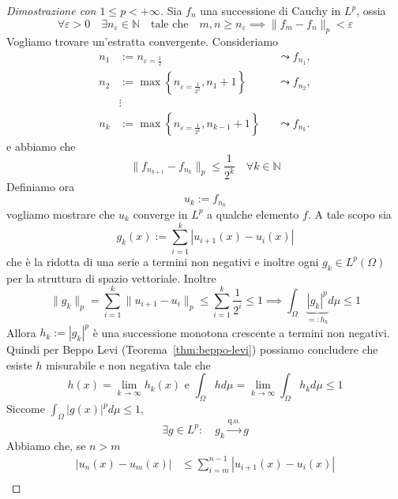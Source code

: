 \begin{proof}[Dimostrazione con \(1 \le p < +\infty\)]
    Sia \(f_{n}\) una successione di Cauchy in \(L^{p}\), ossia
    \begin{equation}\label{eq:cauchy_lp}
        \forall \varepsilon > 0 \quad \exists n_\varepsilon \in \mathbb{N} \quad
        \text{tale che} \quad m, n \ge n_\varepsilon \implies \|f_{m} -
        f_{n}\|_{p} < \varepsilon
    \end{equation}
    Vogliamo trovare un'estratta convergente. Consideriamo
    \[
    \begin{aligned}
        n_1 &:= n_{\varepsilon = \frac{1}{2}} &&\leadsto f_{n_1}, \\
        n_2 &:= \max\left\{n_{\varepsilon = \frac{1}{2^2}}, n_1 + 1\right\} &&\leadsto f_{n_2}, \\
        &\vdots \\
        n_k &:= \max\left\{n_{\varepsilon = \frac{1}{2^k}}, n_{k-1} + 1\right\} &&\leadsto f_{n_k}.
    \end{aligned}
    \]
    e abbiamo che
    \[
        \|f_{n_{k+1}} - f_{n_k} \|_p \le \frac{1}{2^{k}} \quad \forall k \in
        \mathbb{N}
    \]
    Definiamo ora 
    \[u_k := f_{n_k} \] 
    vogliamo mostrare che \(u_k\) converge in \(L^{p}\) a qualche elemento
    \(f\). A tale scopo sia
    \[
        g_k(x) := \sum_{i=1}^{k} \left| u_{i+1} {(x)} - u_{i}{(x)} \right|  
    \]
    che è la ridotta di una serie a termini non negativi e inoltre ogni \(g_k
    \in L^{p}(\Omega)\) per la struttura di spazio vettoriale. Inoltre
    \[
        \|g_k\|_p = \sum_{i=1}^{k} \|u_{i+1} -u_{i}\|_p \le \sum_{i=1}^{k}
        \frac{1}{2^{i}} \le 1 \implies \int_{\Omega} \underbrace{\left| g_k
        \right|^{p}}_{=:h_k} d\mu
        \le 1
    \]
    Allora \(h_k := |g_k|^{p}\) è una successione monotona crescente a termini
    non negativi.
    Quindi per Beppo Levi (Teorema~\ref{thm:beppo-levi})
possiamo concludere che esiste \(h\) misurabile e non negativa tale
che 
\[
    h(x) = \lim_{k\to \infty} h_k(x) \text{ e } \int_{\Omega} h d\mu =
    \lim_{k\to \infty} \int_{\Omega} h_k d\mu \le 1
\]
Siccome \(\int_{\Omega} |g(x)|^{p} d\mu \le 1 \), 
\[\exists g \in L^p: \quad g_k \overset{\text{q.o.}}{\rightarrow} g\]
Abbiamo che, se \(n > m\) 
\begin{equation}\label{eq:cauchy_lp_pf1}
    \begin{aligned}
        \left| u_n(x) - u_m(x) \right| 
        &\le \sum_{i=m}^{n-1} \left| u_{i+1}(x) - u_i(x) \right| \\

\end{aligned}
\end{equation}
\end{proof}
